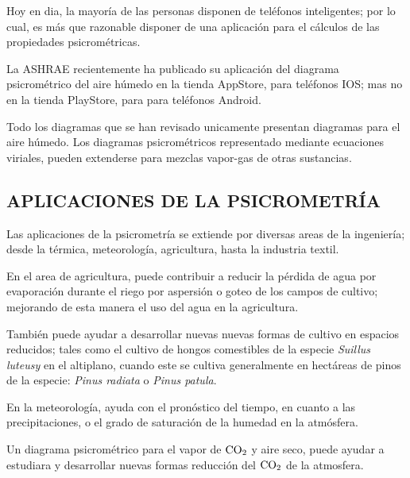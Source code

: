 
    Hoy en dia, la mayoría de las personas disponen de teléfonos inteligentes; por lo cual, es más que razonable disponer de una aplicación para el cálculos de las propiedades psicrométricas.

    La ASHRAE recientemente ha publicado su aplicación del diagrama psicrométrico  del aire húmedo en la tienda AppStore, para teléfonos IOS; mas no en la tienda PlayStore, para para teléfonos Android.

    Todo los diagramas que se han revisado unicamente presentan diagramas para el aire húmedo. Los diagramas psicrométricos representado mediante ecuaciones viriales, pueden extenderse para mezclas vapor-gas de otras sustancias.


    \subsection*{APLICACIONES DE LA PSICROMETRÍA} 

    Las aplicaciones de la psicrometría se extiende por diversas areas de la ingeniería; desde la térmica, meteorología, agricultura, hasta la industria textil.

    En el area de agricultura, puede contribuir a reducir la pérdida de agua por evaporación durante el riego  por aspersión o goteo de los campos de cultivo; mejorando de esta manera el uso del agua en la agricultura.

    También puede ayudar a desarrollar nuevas nuevas formas de cultivo en espacios reducidos; tales como el cultivo de hongos comestibles de la especie \textit{Suillus luteusy} en el altiplano, cuando este se cultiva generalmente en hectáreas de pinos de la especie: \textit{Pinus radiata} o \textit{Pinus patula}.

    En la meteorología, ayuda con el pronóstico del tiempo, en cuanto a las precipitaciones, o el grado de saturación de la humedad en la atmósfera.

    Un diagrama psicrométrico para el vapor de $\ce{CO2}$ y aire seco, puede ayudar a estudiara y desarrollar nuevas formas reducción del $\ce{CO2}$ de la atmosfera.


